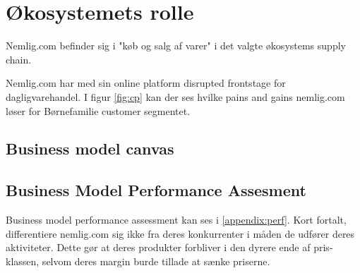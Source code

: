 \section{Økosystemets rolle}
Nemlig.com befinder sig i "køb og salg af varer" i det valgte økosystems supply chain.

Nemlig.com har med sin online platform disrupted frontstage for dagligvarehandel. I figur \ref{fig:cp} kan der ses hvilke pains and gains nemlig.com løser for Børnefamilie customer segmentet.

\subsection{Business model canvas}

\subsection{Business Model Performance Assesment}
Business model performance assessment kan ses i \autoref{appendix:perf}. Kort fortalt, differentiere nemlig.com sig ikke fra deres konkurrenter i måden de udfører deres aktiviteter. Dette gør at deres produkter forbliver i den dyrere ende af pris-klassen, selvom deres margin burde tillade at sænke priserne.
